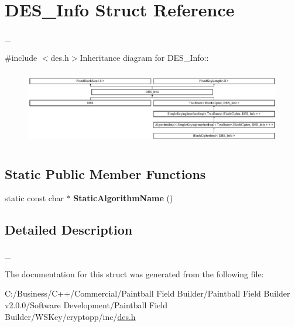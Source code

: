 \hypertarget{struct_d_e_s___info}{
\section{DES\_\-Info Struct Reference}
\label{struct_d_e_s___info}
}


\_\-  


{\ttfamily \#include $<$des.h$>$}Inheritance diagram for DES\_\-Info::\begin{figure}[H]
\begin{center}
\leavevmode
\includegraphics[height=3.33996cm]{struct_d_e_s___info}
\end{center}
\end{figure}
\subsection*{Static Public Member Functions}
\begin{DoxyCompactItemize}
\item 
\hypertarget{struct_d_e_s___info_a3328113a7778dafd4cb56cf634189be9}{
static const char $\ast$ {\bfseries StaticAlgorithmName} ()}
\label{struct_d_e_s___info_a3328113a7778dafd4cb56cf634189be9}

\end{DoxyCompactItemize}


\subsection{Detailed Description}
\_\- 

The documentation for this struct was generated from the following file:\begin{DoxyCompactItemize}
\item 
C:/Business/C++/Commercial/Paintball Field Builder/Paintball Field Builder v2.0.0/Software Development/Paintball Field Builder/WSKey/cryptopp/inc/\hyperlink{des_8h}{des.h}\end{DoxyCompactItemize}
